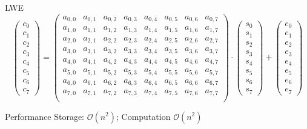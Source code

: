\documentclass[xcolor=table,10pt,aspectratio=169]{beamer}
\begin{document}
\begin{frame}[label={sec:orgb1878f3}]{LWE}
\[
\begin{pmatrix}c_{0} \\ c_{1} \\ c_{2} \\ c_{3} \\ c_{4} \\ c_{5} \\ c_{6} \\ c_{7}\end{pmatrix} = 
\left(\begin{array}{rrrrrrrr}
a_{0,0} & a_{0,1} & a_{0,2} & a_{0,3} & a_{0,4} & a_{0,5} & a_{0,6} & a_{0,7}\\
a_{1,0} & a_{1,1} & a_{1,2} & a_{1,3} & a_{1,4} & a_{1,5} & a_{1,6} & a_{1,7}\\
a_{2,0} & a_{2,1} & a_{2,2} & a_{2,3} & a_{2,4} & a_{2,5} & a_{2,6} & a_{2,7}\\
a_{3,0} & a_{3,1} & a_{3,2} & a_{3,3} & a_{3,4} & a_{3,5} & a_{3,6} & a_{3,7}\\
a_{4,0} & a_{4,1} & a_{4,2} & a_{4,3} & a_{4,4} & a_{4,5} & a_{4,6} & a_{4,7}\\
a_{5,0} & a_{5,1} & a_{5,2} & a_{5,3} & a_{5,4} & a_{5,5} & a_{5,6} & a_{5,7}\\
a_{6,0} & a_{6,1} & a_{6,2} & a_{6,3} & a_{6,4} & a_{6,5} & a_{6,6} & a_{6,7}\\
a_{7,0} & a_{7,1} & a_{7,2} & a_{7,3} & a_{7,4} & a_{7,5} & a_{7,6} & a_{7,7}\\
\end{array}\right) \cdot
\begin{pmatrix}s_{0} \\ s_{1} \\ s_{2} \\ s_{3} \\ s_{4} \\ s_{5} \\ s_{6} \\ s_{7}\end{pmatrix} +
\begin{pmatrix}e_{0} \\ e_{1} \\ e_{2} \\ e_{3} \\ e_{4} \\ e_{5} \\ e_{6} \\ e_{7}\end{pmatrix}
\]
\begin{block}{Performance}
Storage: \(\mathcal{O}(n^{2})\); Computation \(\mathcal{O}(n^{2})\)
\end{block}
\end{frame}
\end{document}
